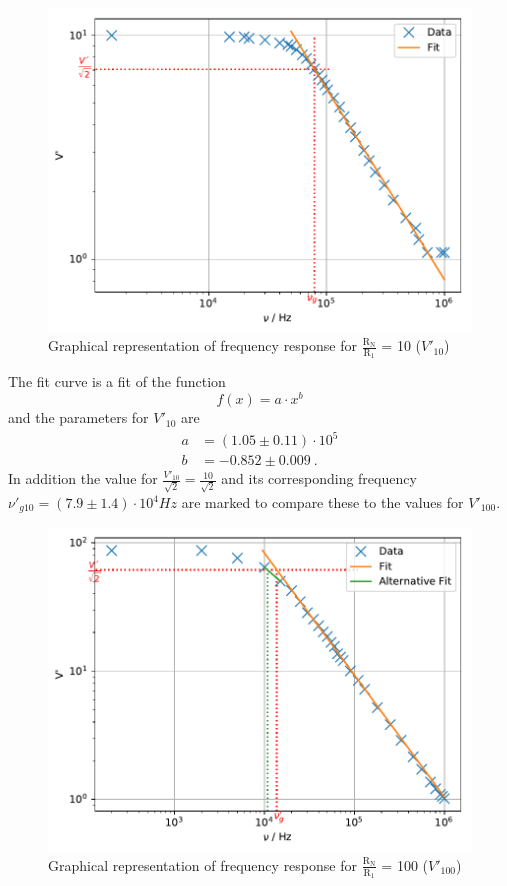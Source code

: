 \begin{figure}
  \centering
  \includegraphics[scale=0.75]{plot1.pdf}
  \caption{Graphical representation of frequency response for $\frac{\text{R}_\text{N}}{\text{R}_\text{1}}$ = 10 ($V'_{10}$)} \label{fig:1}
\end{figure}
The fit curve is a fit of the function
\begin{equation*}
  f(x) = a\cdot x^b
\end{equation*}
and the parameters for $V'_{10}$ are
\begin{align*}
a &= (1.05\pm 0.11)\cdot 10^5 \\
b &= -0.852\pm 0.009 \ .
\end{align*}
In addition the value for $\frac{V'_{10}}{\sqrt{2}} = \frac{10}{\sqrt{2}}$ and its corresponding frequency $\nu'_{g10} = (7.9 \pm 1.4)\cdot 10^4 Hz$ are marked
to compare these to the values for $V'_{100}$.
\begin{figure}[H]
  \centering
  \includegraphics[scale=0.75]{plot3.pdf}
  \caption{Graphical representation of frequency response for $\frac{\text{R}_\text{N}}{\text{R}_\text{1}}$ = 100 ($V'_{100}$)} \label{fig:2}
\end{figure}
